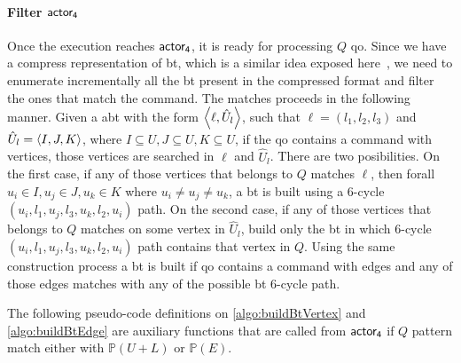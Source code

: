 \paragraph{Filter $\mathsf{actor_4}$} Once the execution reaches $\mathsf{actor_4}$, it is ready for processing $Q$ \acrlong{qo}. 
Since we have a compress representation of \acrshort{bt}, which is a similar idea exposed here~\cite{Lai}, we need to enumerate incrementally all the \acrshort{bt} present in the compressed format and filter the ones that match the command.
The matches proceeds in the following manner. Given a \acrshort{abt} with the form $\left\langle \ell, \hat{U}_l \right\rangle$, such that $\ell = (l_1,l_2,l_3)$ and $\hat{U}_l = \left\langle I,J,K \right\rangle$, where $I \subseteq U, J \subseteq U, K \subseteq U$, if the \acrshort{qo} contains a command with vertices, those vertices are searched in $\ell$ and $\hat{U}_l$. 
There are two posibilities. On the first case, if any of those vertices that belongs to $Q$ matches $\ell$, then forall $u_i \in I, u_j \in J, u_k \in K$ where $ u_i \neq u_j \neq u_k$, a \acrshort{bt} is built using a 6-cycle $(u_i, l_1, u_j, l_3, u_k, l_2, u_i)$ path.
On the second case, if any of those vertices that belongs to $Q$ matches on some vertex in $\hat{U}_l$, build only the \acrshort{bt} in which 6-cycle $(u_i, l_1, u_j, l_3, u_k, l_2, u_i)$ path contains that vertex in $Q$.
Using the same construction process a \acrshort{bt} is built if \acrshort{qo} contains a command with edges and any of those edges matches with any of the possible \acrshort{bt} 6-cycle path.

The following pseudo-code definitions on \autoref{algo:buildBtVertex} and \autoref{algo:buildBtEdge} are auxiliary functions that are called
from $\mathsf{actor_4}$ if $Q$ pattern match either with $\mathbb{P}(U + L)$ or $\mathbb{P}(E)$.


